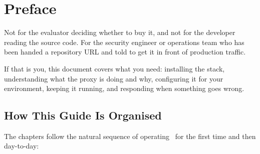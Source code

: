 
\chapter*{Preface}

Not for the evaluator deciding whether to buy it, and not for the developer
reading the source code. For the security engineer or operations team who has
been handed a repository URL and told to get it in front of production traffic.

If that is you, this document covers what you need: installing the stack, understanding
what the proxy is doing and why, configuring it for your environment, keeping it running,
and responding when something goes wrong.

\section*{How This Guide Is Organised}

The chapters follow the natural sequence of operating \ja\ for the first time and
then day-to-day:

